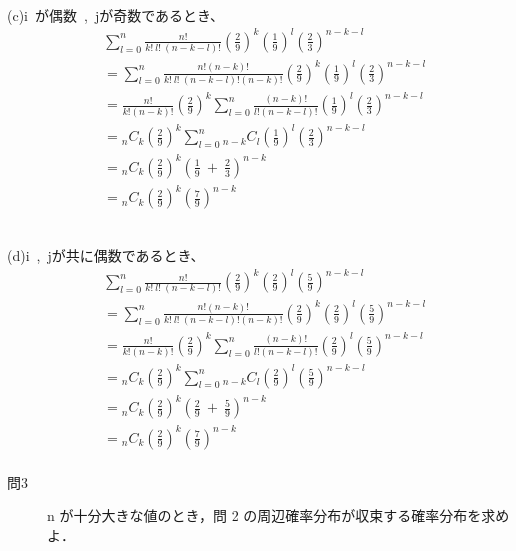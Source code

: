 \documentclass[12pt,a4paper]{jsarticle}
\begin{document}
~\\
(c)i~が偶数~,~jが奇数であるとき、\\
\begin{align*}
    & \sum^n_{l = 0} \frac{n!}{k!~l!~(n-k-l)!} \left(\frac{2}{9}\right)^k \left(\frac{1}{9}\right)^l \left(\frac{2}{3}\right)^{n-k-l} \\
    &= \sum^n_{l = 0} \frac{n!(n-k)!}{k!~l!~(n-k-l)!(n-k)!} \left(\frac{2}{9}\right)^k \left(\frac{1}{9}\right)^l \left(\frac{2}{3}\right)^{n-k-l} \\
    &= \frac{n!}{k!(n-k)!}\left(\frac{2}{9}\right)^k \sum^n_{l = 0}\frac{(n-k)!}{l!(n-k-l)!}\left(\frac{1}{9}\right)^l\left(\frac{2}{3}\right)^{n-k-l} \\
    &= {}_n C_k \left(\frac{2}{9}\right)^k \sum^n_{l = 0} {}_{n-k} C_l \left(\frac{1}{9}\right)^l\left(\frac{2}{3}\right)^{n-k-l} \\
    &= {}_n C_k \left(\frac{2}{9}\right)^k \left(\frac{1}{9}~+~\frac{2}{3}\right)^{n-k} \\
    &= {}_n C_k \left(\frac{2}{9}\right)^k \left(\frac{7}{9}\right)^{n-k}
\end{align*}

~\\
(d)i~,~jが共に偶数であるとき、\\
\begin{align*}
    & \sum^n_{l = 0} \frac{n!}{k!~l!~(n-k-l)!} \left(\frac{2}{9}\right)^k \left(\frac{2}{9}\right)^l \left(\frac{5}{9}\right)^{n-k-l} \\
    &= \sum^n_{l = 0} \frac{n!(n-k)!}{k!~l!~(n-k-l)!(n-k)!} \left(\frac{2}{9}\right)^k \left(\frac{2}{9}\right)^l \left(\frac{5}{9}\right)^{n-k-l} \\
    &= \frac{n!}{k!(n-k)!}\left(\frac{2}{9}\right)^k \sum^n_{l = 0}\frac{(n-k)!}{l!(n-k-l)!}\left(\frac{2}{9}\right)^l\left(\frac{5}{9}\right)^{n-k-l} \\
    &= {}_n C_k \left(\frac{2}{9}\right)^k \sum^n_{l = 0} {}_{n-k} C_l \left(\frac{2}{9}\right)^l\left(\frac{5}{9}\right)^{n-k-l} \\
    &= {}_n C_k \left(\frac{2}{9}\right)^k \left(\frac{2}{9}~+~\frac{5}{9}\right)^{n-k} \\
    &= {}_n C_k \left(\frac{2}{9}\right)^k \left(\frac{7}{9}\right)^{n-k}\\
\end{align*}


\begin{description}
    \item [問3] n が十分大きな値のとき，問 2 の周辺確率分布が収束する確率分布を求めよ．
\end{description}
\end{document}
